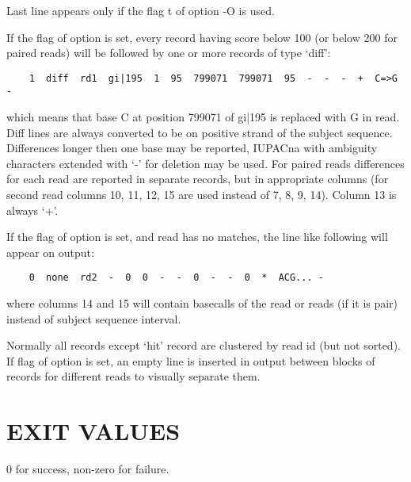 \documentclass[english]{article}
\begin{document}
    Last line appears only if the flag t of option -O is used.

    If the flag  of option  is set, every record having score below 100 (or
    below 200 for paired reads) will be followed by one or more records of
    type `diff':

	\begin{verbatim}
    1  diff  rd1  gi|195  1  95  799071  799071  95  -  -  -  +  C=>G  -
	\end{verbatim}

    which means that base C at position 799071 of gi|195 is replaced with G in
    read. Diff lines are always converted to be on positive strand of the
    subject sequence.  Differences longer then one base may be reported,
    IUPACna with ambiguity characters extended with `-' for deletion may be
    used. For paired reads differences for each read are reported in separate
    records, but in appropriate columns (for second read columns 10, 11, 12, 15
    are used instead of 7, 8, 9, 14). Column 13 is always `+'.

    If the flag  of option  is set, and read has no matches, the line like
    following will appear on output:

	\begin{verbatim}
    0  none  rd2  -  0  0  -  -  0  -  -  0  *  ACG... -
	\end{verbatim}

    where columns 14 and 15 will contain basecalls of the read or reads (if it
    is pair) instead of subject sequence interval.

    Normally all records except `hit' record are clustered by read id (but not
    sorted). If flag  of option  is set, an empty line is inserted in
    output between blocks of records for different reads to visually separate
    them.

\section{EXIT VALUES}
    0 for success, non-zero for failure.

\LatexManEnd
\end{document}
